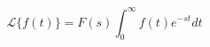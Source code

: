     \begin{center}
        \begin{equation*}
            \mathcal{L} \lbrace f(t) \rbrace = F(s) \int_{0}^{\infty} f(t) e^{-st} dt
        \end{equation*}
    \end{center}
